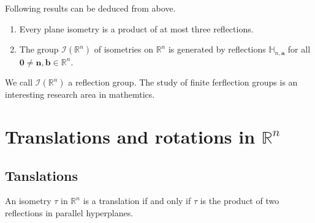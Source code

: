 \begin{corollary}
  Following results can be deduced from above.

  \begin{enumerate}
    \item Every plane isometry is a product of at most three reflections.
    \item The group \( \mathscr{I} \left( \mathbb{R}^{n} \right) \) of isometries on \( \mathbb{R}^{n} \) is generated by reflections \( \mathbb{H}_{n,\mathbf{a}} \) for all \( \mathbf{0} \neq \mathbf{n},\mathbf{b} \in \mathbb{R}^{n} \).
  \end{enumerate}

 
\end{corollary}

\begin{remark}
  We call \( \mathscr{I} \left(\mathbb{R}^{n}  \right) \) a reflection group. The study of finite ferflection groups is an interesting research area in
  mathemtics.
\end{remark}

\section{Translations and rotations in \( \mathbb{R}^{n} \)}

\subsection{Tanslations}

\begin{theorem}
 An isometry \( \tau  \)  in \( \mathbb{R}^{n} \) is a translation if and only if \( \tau  \) is the product of two reflections 
 in parallel hyperplanes.

\end{theorem}

